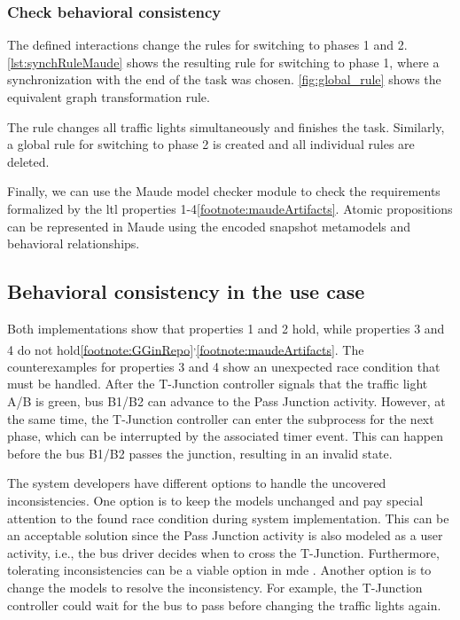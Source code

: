 \documentclass{jot}
\begin{document}
\subsubsection{Check behavioral consistency}
The defined interactions change the rules for switching to phases 1 and 2. \autoref{lst:synchRuleMaude} shows the resulting rule for switching to phase 1, where a synchronization with the end of the task was chosen.
\autoref{fig:global_rule} shows the equivalent graph transformation rule.


The rule changes all traffic lights simultaneously and finishes the task.
Similarly, a global rule for switching to phase 2 is created and all individual rules are deleted.

Finally, we can use the Maude model checker module to check the requirements formalized by the \gls*{ltl} properties 1-4\cref{footnote:maudeArtifacts}.
Atomic propositions can be represented in Maude using the encoded snapshot metamodels and behavioral relationships.

\subsection{Behavioral consistency in the use case}

Both implementations show that properties 1 and 2 hold, while properties 3 and 4 do not hold\cref{footnote:GGinRepo}\textsuperscript{,}\cref{footnote:maudeArtifacts}.
The counterexamples for properties 3 and 4 show an unexpected race condition that must be handled.
After the T-Junction controller signals that the traffic light A/B is green, bus B1/B2 can advance to the \textsf{Pass Junction} activity.
However, at the same time, the T-Junction controller can enter the subprocess for the next phase, which can be interrupted by the associated timer event.
This can happen before the bus B1/B2 passes the junction, resulting in an invalid state.

The system developers have different options to handle the uncovered inconsistencies.
One option is to keep the models unchanged and pay special attention to the found race condition during system implementation.
This can be an acceptable solution since the \textsf{Pass Junction} activity is also modeled as a user activity, i.e., the bus driver decides when to cross the T-Junction.
Furthermore, tolerating inconsistencies can be a viable option in \gls*{mde} \cite{weidmannToleranceModelDrivenEngineering2021}.
Another option is to change the models to resolve the inconsistency.
For example, the T-Junction controller could wait for the bus to pass before changing the traffic lights again.
\end{document}
